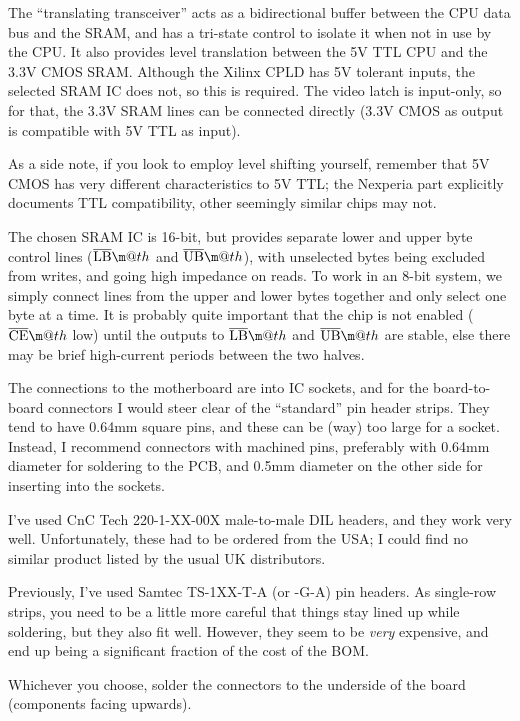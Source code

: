 \documentclass[12pt]{article}
\makeatletter
\newcommand*{\textoverline}[1]{$\overline{\hbox{#1}}\m@th$}
\makeatother
\begin{document}
The ``translating transceiver'' acts as a bidirectional buffer between the CPU
data bus and the SRAM, and has a tri-state control to isolate it when not in
use by the CPU.  It also provides level translation between the 5V TTL CPU and
the 3.3V CMOS SRAM.  Although the Xilinx CPLD has 5V tolerant inputs, the
selected SRAM IC does not, so this is required.  The video latch is input-only,
so for that, the 3.3V SRAM lines can be connected directly (3.3V CMOS as output
is compatible with 5V TTL as input).

As a side note, if you look to employ level shifting yourself, remember that 5V
CMOS has very different characteristics to 5V TTL; the Nexperia part explicitly
documents TTL compatibility, other seemingly similar chips may not.

The chosen SRAM IC is 16-bit, but provides separate lower and upper byte
control lines (\textoverline{LB} and \textoverline{UB}), with unselected bytes
being excluded from writes, and going high impedance on reads.  To work in an
8-bit system, we simply connect lines from the upper and lower bytes together
and only select one byte at a time.  It is probably quite important that the
chip is not enabled (\textoverline{CE} low) until the outputs to
\textoverline{LB} and \textoverline{UB} are stable, else there may be brief
high-current periods between the two halves.

The connections to the motherboard are into IC sockets, and for the
board-to-board connectors I would steer clear of the ``standard'' pin header
strips.  They tend to have 0.64mm square pins, and these can be (way) too large
for a socket.  Instead, I recommend connectors with machined pins, preferably
with 0.64mm diameter for soldering to the PCB, and 0.5mm diameter on the other
side for inserting into the sockets.

I've used CnC Tech 220-1-XX-00X male-to-male DIL headers, and they work very
well.  Unfortunately, these had to be ordered from the USA; I could find no
similar product listed by the usual UK distributors.

Previously, I've used Samtec TS-1XX-T-A (or -G-A) pin headers.  As single-row
strips, you need to be a little more careful that things stay lined up while
soldering, but they also fit well.  However, they seem to be \textit{very}
expensive, and end up being a significant fraction of the cost of the BOM.

Whichever you choose, solder the connectors to the underside of the board
(components facing upwards).
\end{document}
